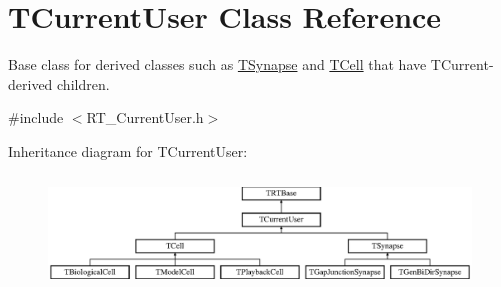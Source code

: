\hypertarget{class_t_current_user}{\section{T\+Current\+User Class Reference}
\label{class_t_current_user}
}


Base class for derived classes such as \hyperlink{class_t_synapse}{T\+Synapse} and \hyperlink{class_t_cell}{T\+Cell} that have T\+Current-\/derived children.  




{\ttfamily \#include $<$R\+T\+\_\+\+Current\+User.\+h$>$}

Inheritance diagram for T\+Current\+User\+:\begin{figure}[H]
\begin{center}
\leavevmode
\includegraphics[height=3.047619cm]{class_t_current_user}
\end{center}
\end{figure}
